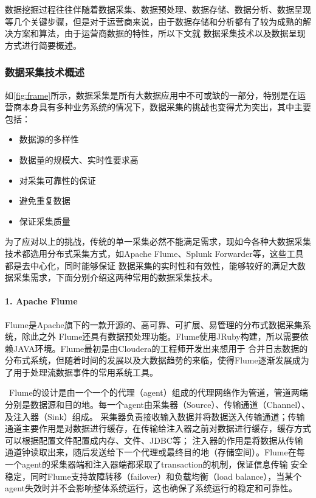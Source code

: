 \documentclass{HustGraduPaper}
\begin{document}
    数据挖掘过程往往伴随着数据采集、数据预处理、数据存储、数据分析、数据呈现等几个关键步骤，但是对于运营商来说，由于数据存储和分析都有了较为成熟的解决方案和算法，由于运营商数据的特性，所以下文就
    数据采集技术以及数据呈现方式进行简要概述。
    \subsubsection{数据采集技术概述}
    
    如\autoref{fig:frame}所示，数据采集是所有大数据应用中不可或缺的一部分，特别是在运营商本身具有多种业务系统的情况下，数据采集的挑战也变得尤为突出，其中主要包括：
    \begin{itemize}
		\item 数据源的多样性
        \item 数据量的规模大、实时性要求高
        \item 对采集可靠性的保证
        \item 避免重复数据
        \item 保证采集质量
    \end{itemize}
    为了应对以上的挑战，传统的单一采集必然不能满足需求，现如今各种大数据采集技术都选用分布式采集方式，如Apache Flume、Splunk Forwarder等，这些工具都是去中心化，同时能够保证
    数据采集的实时性和有效性，能够较好的满足大数据采集需求，下面分别介绍这两种常用的数据采集技术。
    \bigskip
    \paragraph{1. Apache Flume\\}

    Flume是Apache旗下的一款开源的、高可靠、可扩展、易管理的分布式数据采集系统，除此之外 Flume还具有数据预处理功能。Flume使用JRuby构建，所以需要依赖JAVA环境。Flume最初是由Cloudera的工程师开发出来想用于
    合并日志数据的分布式系统，但随着时间的发展以及大数据趋势的来临，使得Flume逐渐发展成为了用于处理流数据事件的常用系统工具。%

    \ Flume的设计是由一个一个的代理（agent）组成的代理网络作为管道，管道两端分别是数据源和目的地。每一个agent由采集器（Source）、传输通道（Channel）、及注入器（Sink）组成。
    采集器负责接收输入数据并将数据送入传输通道；传输通道主要作用是对数据进行缓存，在传输给注入器之前对数据进行缓存，缓存方式可以根据配置文件配置成内存、文件、JDBC等；
    注入器的作用是将数据从传输通道钟读取出来，随后发送给下一个代理或最终目的地（存储空间）。Flume在每一个agent的采集器端和注入器端都采取了transaction的机制，保证信息传输
    安全稳定，同时Flume支持故障转移（failover）和负载均衡（load balance），当某个agent失效时并不会影响整体系统运行，这也确保了系统运行的稳定和可靠性。
\end{document}
